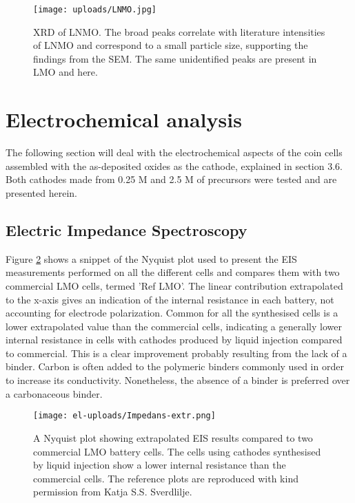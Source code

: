 \documentclass[Main/main.tex]{subfiles}
\begin{document}
\begin{figure}[ht]
    \centering
    \texttt{[image: uploads/LNMO.jpg]}
    \caption{XRD of LNMO. The broad peaks correlate with literature intensities of LNMO and correspond to a small particle size, supporting the findings from the SEM. The same unidentified peaks are present in LMO and here.}
    \label{fig:XRD_LNMO}
\end{figure}




\FloatBarrier   
\section{Electrochemical analysis}
The following section will deal with the electrochemical aspects of the coin cells assembled with the as-deposited oxides as the cathode, explained in section 3.6. Both cathodes made from 0.25 M and 2.5 M of precursors were tested and are presented herein.


\subsection{Electric Impedance Spectroscopy}
Figure \ref{fig:Impedance} shows a snippet of the Nyquist plot used to present the EIS measurements performed on all the different cells and compares them with two commercial LMO cells, termed 'Ref LMO'. The linear contribution extrapolated to the x-axis gives an indication of the internal resistance in each battery, not accounting for electrode polarization. Common for all the synthesised cells is a lower extrapolated value than the commercial cells, indicating a generally lower internal resistance in cells with cathodes produced by liquid injection compared to commercial. This is a clear improvement probably resulting from the lack of a binder. Carbon is often added to the polymeric binders commonly used in order to increase its conductivity. Nonetheless, the absence of a binder is preferred over a carbonaceous binder.


\begin{figure}[ht]
    \centering
    \texttt{[image: el-uploads/Impedans-extr.png]}
    \caption{A Nyquist plot showing extrapolated EIS results compared to two commercial LMO battery cells. The cells using cathodes synthesised by liquid injection show a lower internal resistance than the commercial cells. The reference plots are reproduced with kind permission from Katja S.S. Sverdlilje.}
    \label{fig:Impedance}
\end{figure}
\end{document}
